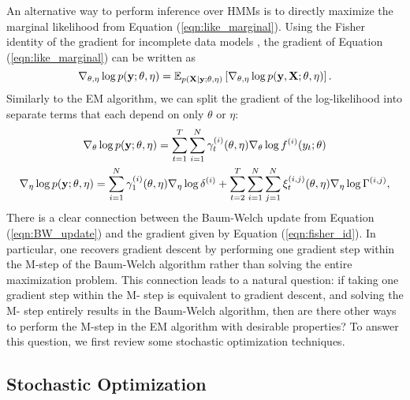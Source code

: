 An alternative way to perform inference over HMMs is to directly maximize the marginal likelihood from Equation (\ref{eqn:like_marginal}). Using the Fisher identity of the gradient for incomplete data models \citep{Fisher:1925}, the gradient of Equation (\ref{eqn:like_marginal}) can be written as
%
\begin{equation}
    \nabla_{\theta,\eta} \log p(\mathbf{y};\theta,\eta) = \mathbb{E}_{p(\mathbf{X} \mid \mathbf{y};\theta,\eta)}\left[ \nabla_{\theta,\eta} \log p(\mathbf{y},\mathbf{X};\theta,\eta) \right].
    \label{eqn:fisher_id}
\end{equation}
%
Similarly to the EM algorithm, we can split the gradient of the log-likelihood into separate terms that each depend on only $\theta$ or $\eta$:
%
\begin{gather}
    \nabla_{\theta} \log p(\mathbf{y};\theta,\eta) = \sum_{t=1}^T \sum_{i=1}^N \gamma_t^{(i)}(\theta,\eta) \nabla_{\theta} \log f^{(i)}(y_t; \theta) \label{eqn:theta_update_gd} \\
    \nabla_{\eta} \log p(\mathbf{y};\theta,\eta) = \sum_{i=1}^N \gamma_1^{(i)}(\theta,\eta) \nabla_{\eta} \log \delta^{(i)} + \sum_{t=2}^{T} \sum_{i=1}^N \sum_{j=1}^N \xi_t^{(i,j)}(\theta,\eta) \nabla_{\eta} \log \Gamma^{(i,j)}, \label{eqn:eta_update_gd}
\end{gather}
%
There is a clear connection between the Baum-Welch update from Equation (\ref{eqn:BW_update}) and the gradient given by Equation (\ref{eqn:fisher_id}). In particular, one recovers gradient descent by performing one gradient step within the M-step of the Baum-Welch algorithm rather than solving the entire maximization problem. This connection leads to a natural question: if taking one gradient step within the M- step is equivalent to gradient descent, and solving the M- step entirely results in the Baum-Welch algorithm, then are there other ways to perform the M-step in the EM algorithm with desirable properties? To answer this question, we first review some stochastic optimization techniques.

\subsection{Stochastic Optimization}


